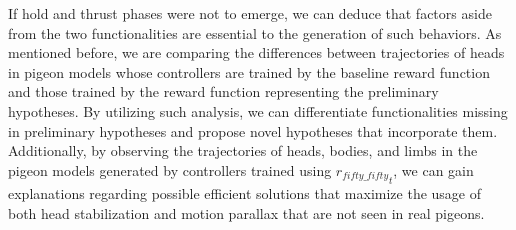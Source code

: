     If hold and thrust phases were not to emerge, we can deduce that factors aside from the two functionalities are essential to the generation of such behaviors.
    As mentioned before, we are comparing the differences between trajectories of heads in pigeon models whose controllers are trained by the baseline reward function and those trained by the reward function representing the preliminary hypotheses.
    By utilizing such analysis, we can differentiate functionalities missing in preliminary hypotheses and propose novel hypotheses that incorporate them.
    Additionally, by observing the trajectories of heads, bodies, and limbs in the pigeon models generated by controllers trained using ${r_{fifty\_fifty}}_t$, we can gain explanations regarding possible efficient solutions that maximize the usage of both head stabilization and motion parallax that are not seen in real pigeons.
